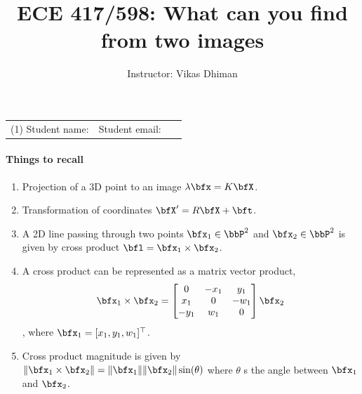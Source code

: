 \documentclass[times,singlecolumn]{article}
\title{ECE 417/598: What can you find from two images}
\author{Instructor: Vikas Dhiman}
\begin{document}
\maketitle
\begin{tabular}{p{0.5\linewidth}p{0.5\linewidth}}
  (1) Student name:& Student email: \\
\end{tabular}

\paragraph{Things to recall}
\begin{enumerate}
  \item Projection of a 3D point to an image $\lambda \bfx = K \bfX$.
  \item Transformation of coordinates $\bfX' = R \bfX + \bft$.
  \item A 2D line passing through two points $\bfx_1 \in \bbP^2$ and $\bfx_2 \in
    \bbP^2$ is given by cross product $\bfl = \bfx_1 \times \bfx_2$.
  \item A cross product can be represented as a matrix vector product,
    \[
      \bfx_1 \times \bfx_2 = \begin{bmatrix}
                               0 & -x_1 & y_1\\
                               x_1 & 0  & -w_1\\
                               -y_1 & w_1  & 0
                               \end{bmatrix} \bfx_2
      \], where $\bfx_1 = [x_1, y_1, w_1]^\top$.
   \item Cross product magnitude is given by $ \| \bfx_1 \times \bfx_2 \| =
     \|\bfx_1 \| \|\bfx_2 \| \sin(\theta)$ where $\theta$ s the angle between
     $\bfx_1$ and $\bfx_2$.
\end{enumerate}
\end{document}
